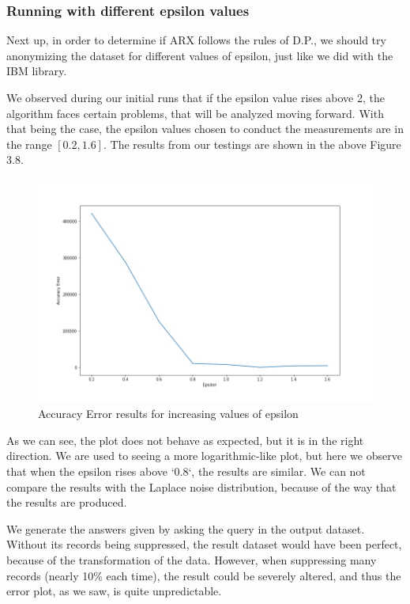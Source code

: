 \subsubsection{Running with different epsilon values}

Next up, in order to determine if ARX follows the rules of D.P., we should try anonymizing the dataset for different values of epsilon, just like we did with the IBM library.

We observed during our initial runs that if the epsilon value rises above 2, the algorithm faces certain problems, that will be analyzed moving forward. With that being the case, the epsilon values chosen to conduct the measurements are in the range $[0.2, 1.6]$. The results from our testings are shown in the above Figure 3.8.

\begin{figure}[!htb]\centering
    \includegraphics[width=1\textwidth]{images/arx_accuracy.png}
    \caption{Accuracy Error results for increasing values of epsilon}
\end{figure}

As we can see, the plot does not behave as expected, but it is in the right direction. We are used to seeing a more logarithmic-like plot, but here we observe that when the epsilon rises above `0.8`, the results are similar. We can not compare the results with the Laplace noise distribution, because of the way that the results are produced. 

We generate the answers given by asking the query in the output dataset. Without its records being suppressed, the result dataset would have been perfect, because of the transformation of the data. However, when suppressing many records (nearly 10\% each time), the result could be severely altered, and thus the error plot, as we saw, is quite unpredictable.


